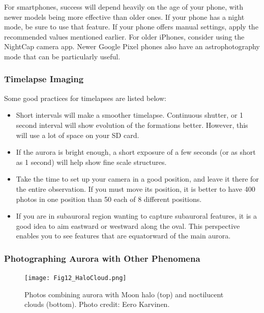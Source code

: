 \documentclass{article}
\begin{document}
For smartphones, success will depend heavily on the age of your phone, with newer models being more effective than older ones. If your phone has a night mode, be sure to use that feature. If your phone offers manual settings, apply the recommended values mentioned earlier. For older iPhones, consider using the NightCap camera app. Newer Google Pixel phones also have an astrophotography mode that can be particularly useful.

\subsubsection{Timelapse Imaging}

Some good practices for timelapses are listed below: 
\begin{itemize}
    \item Short intervals will make a smoother timelapse. Continuous shutter, or 1 second interval will show evolution of the formations better. However, this will use a lot of space on your SD card.
    \item If the aurora is bright enough, a short exposure of a few seconds (or as short as 1 second) will help show fine scale structures.
    \item Take the time to set up your camera in a good position, and leave it there for the entire observation. If you must move its position, it is better to have 400 photos in one position than 50 each of 8 different positions.
    \item If you are in subauroral region wanting to capture subauroral features, it is a good idea to aim eastward or westward along the oval. This perspective enables you to see features that are equatorward of the main aurora.
    
\end{itemize}

\subsubsection{Photographing Aurora with Other Phenomena}

\begin{figure}[h!]
\begin{centering}
  \texttt{[image: Fig12\_HaloCloud.png]}
  \caption{Photos combining aurora with Moon halo (top) and noctilucent clouds (bottom). Photo credit: Eero Karvinen.}
  \label{aurorahalonlc}
  \end{centering}
\end{figure}
\end{document}
